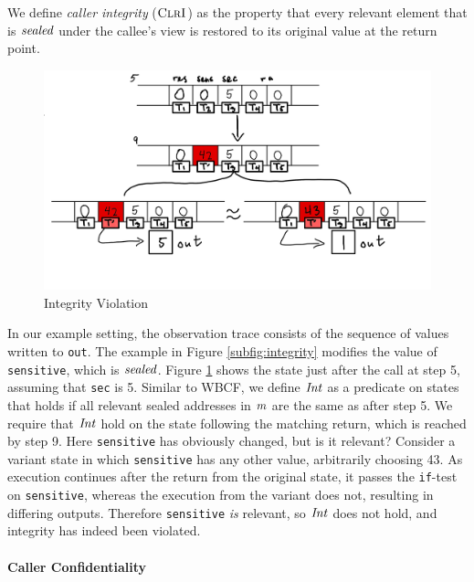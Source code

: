 \documentclass[10pt,conference]{ieeetran}%
\theoremstyle{definition}
\begin{document}
We define \emph{caller integrity} (\(\textnormal{\sc ClrI}\))  as the property that
every relevant element that is \(\mathit{sealed}\) under the callee's view is restored
to its original value at the return point.

\begin{figure}
  \includegraphics[width=\columnwidth]{variants.png}
  \caption{Integrity Violation}
  \label{fig:variant}
\end{figure}

In our example setting, the observation trace consists of the sequence
of values written to {\tt out}.
The example in Figure \ref{subfig:integrity} modifies the value of {\tt sensitive},
which is \(\mathit{sealed}\). Figure \ref{fig:variant} shows the state just after the call at step 5,
assuming that {\tt sec} is 5. Similar to WBCF, we define
\(\mathit{Int}\) as a predicate on states that holds if
all relevant sealed addresses in \(m\) are the same as after step 5.
We require that \(\mathit{Int}\) hold on the state following the matching return,
which is reached by step 9. Here {\tt sensitive} has obviously changed, but is it relevant?
Consider a variant state in which {\tt sensitive} has any other value, arbitrarily
choosing 43. As execution continues after the return
from the original state, it passes the {\tt if}-test on {\tt sensitive}, whereas the execution
from the variant does not, resulting in differing outputs. Therefore {\tt sensitive} \emph{is} relevant,
so \(\mathit{Int}\) does not hold, and integrity has indeed been violated.

\paragraph*{Caller Confidentiality}
\end{document}

